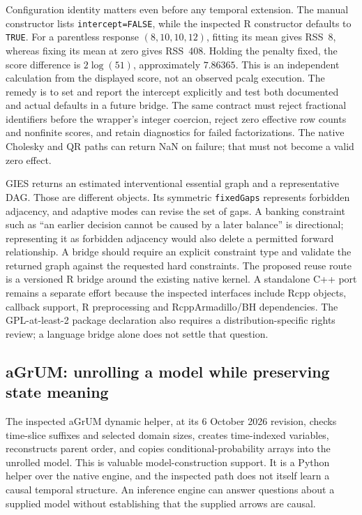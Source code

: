 Configuration identity matters even before any temporal extension. The
manual constructor lists \texttt{intercept=FALSE}, while the inspected R
constructor defaults to \texttt{TRUE}. For a parentless response
$(8,10,10,12)$, fitting its mean gives RSS~8, whereas fixing its mean at zero
gives RSS~408. Holding the penalty fixed, the score difference is
$2\log(51)$, approximately $7.86365$. This is an independent calculation from
the displayed score, not an observed pcalg execution. The remedy is to set and
report the intercept explicitly and test both documented and actual defaults
in a future bridge. The same contract must reject fractional identifiers
before the wrapper's integer coercion, reject zero effective row counts and
nonfinite scores, and retain diagnostics for failed factorizations. The native
Cholesky and QR paths can return NaN on failure; that must not become a valid
zero effect. \citep{exec16_ct_pcalg,exec16_ct_oracle}

GIES returns an estimated interventional essential graph and a representative
DAG. Those are different objects. Its symmetric \texttt{fixedGaps} represents
forbidden adjacency, and adaptive modes can revise the set of gaps. A banking
constraint such as ``an earlier decision cannot be caused by a later balance''
is directional; representing it as forbidden adjacency would also delete a
permitted forward relationship. A bridge should require an explicit constraint
type and validate the returned graph against the requested hard constraints.
The proposed reuse route is a versioned R bridge around the existing native
kernel. A standalone C++ port remains a separate effort because the inspected
interfaces include Rcpp objects, callback support, R preprocessing and
RcppArmadillo/BH dependencies. The GPL-at-least-2 package declaration also
requires a distribution-specific rights review; a language bridge alone does
not settle that question. \citep{exec16_ct_pcalg}

\subsection{aGrUM: unrolling a model while preserving state meaning}

The inspected aGrUM dynamic helper, at its 6 October 2026 revision, checks
time-slice suffixes and selected domain sizes, creates time-indexed variables,
reconstructs parent order, and copies conditional-probability arrays into the
unrolled model. This is valuable model-construction support. It is a Python
helper over the native engine, and the inspected path does not itself learn
a causal temporal structure. An inference engine can answer questions about
a supplied model without establishing that the supplied arrows are causal.
\citep{exec16_ct_agrum}


